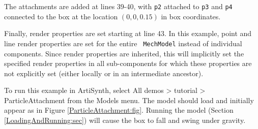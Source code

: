 The attachments are added at lines 39-40, with {\tt p2} attached to
{\tt p3} and {\tt p4} connected to the box at the location $(0, 0,
0.15)$ in box coordinates. 

Finally, render properties are set starting at line 43. In this
example, point and line render properties are set for the entire {\tt
MechModel} instead of individual components.  Since render properties
are inherited, this will implicitly set the specified render
properties in all sub-components for which these properties are not
explicitly set (either locally or in an intermediate ancestor).

To run this example in ArtiSynth, select {\sf All demos > tutorial >
ParticleAttachment} from the {\sf Models} menu. The model should load
and initially appear as in Figure \ref{ParticleAttachment:fig}.
Running the model (Section \ref{LoadingAndRunning:sec}) will cause the
box to fall and swing under gravity.


